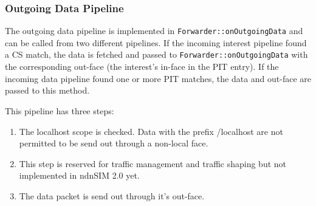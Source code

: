 \subsubsection{Outgoing Data Pipeline}

The outgoing data pipeline is implemented in \texttt{Forwarder::onOutgoingData} and can be called from two different pipelines. If the incoming interest pipeline found a CS match, the data is fetched and passed to \texttt{Forwarder::onOutgoingData} with the corresponding out-face (the interest's in-face in the PIT entry). If the incoming data pipeline found one or more PIT matches, the data and out-face are passed to this method.

This pipeline has three steps:

\begin{enumerate}
\item The localhost scope is checked. Data with the prefix /localhost are not permitted to be send out through a non-local face.
\item This step is reserved for traffic management and traffic shaping but not implemented in ndnSIM 2.0 yet.
\item The data packet is send out through it's out-face.
\end{enumerate}



